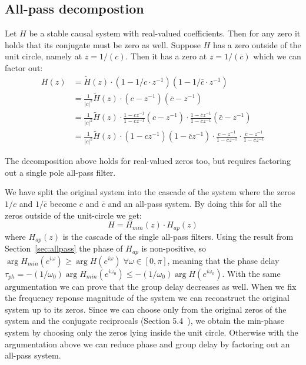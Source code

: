 \subsection{All-pass decompostion}
Let $H$ be a stable causal system with real-valued coefficients. Then for any zero it holds that its conjugate must be zero as well. Suppose $H$ has a zero outside of the unit circle, namely at $z = 1/(c)$. Then it has a zero at $z = 1/(\bar{c})$ which we can factor out:
\begin{align*}
    H(z)
     & = \tilde{H}(z) \cdot (1 - 1/c \cdot z^{-1}) (1 - 1/\bar{c} \cdot z^{-1})
    \\ &= \frac{1}{|c|^2} \tilde{H}(z) \cdot (c - z^{-1}) (\bar{c} - z^{-1})
    \\ &= \frac{1}{|c|^2}\tilde{H}(z) \cdot \frac{1 - c z^{-1}}{1 - c z^{-1}}(c - z^{-1}) \cdot \frac{1 - \bar{c} z^{-1}}{1 - \bar{c} z^{-1}}(\bar{c} - z^{-1})
    \\ &= \frac{1}{|c|^2}\tilde{H}(z) \cdot (1 - c z^{-1}) (1 - \bar{c} z^{-1}) \cdot \frac{c - z^{-1}}{1 - \bar{c} z^{-1}} \cdot \frac{\bar{c} - z^{-1}}{1 - c z^{-1}}
\end{align*}

\begin{remark}
    The decomposition above holds for real-valued zeros too, but requires factoring out a single pole all-pass filter.
\end{remark}

We have split the original system into the cascade of the system where the zeros $1/{c}$ and $1/\bar{c}$ become $c$ and $\bar{c}$ and an all-pass system. By doing this for all the zeros outside of the unit-circle we get:
\[H = H_{min}(z) \cdot H_{ap}(z)\]
where $H_{ap}(z)$ is the cascade of the single all-pass filters. Using the result from Section~\ref{sec:allpass} the phase of $H_{ap}$ is non-positive, so $\arg H_{min}(e^{i\omega}) \geq \arg H(e^{i\omega}) \; \forall \omega \in [0, \pi]$, meaning that the phase delay $\tau_{ph} = -(1 / \omega_0) \arg H_{min}(e^{i\omega_0}) \leq -(1 / \omega_0) \arg H(e^{i\omega_0})$. With the same argumentation we can prove that the group delay decreases as well. When we fix the frequency reponse magnitude of the system we can reconstruct the original system up to its zeros. Since we can choose only from the original zeros of the system and the conjugate reciprocals (Section 5.4~\cite{oppenheim2010discrete}), we obtain the min-phase system by choosing only the zeros lying inside the unit circle. Otherwise with the argumentation above we can reduce phase and group delay by factoring out an all-pass system.